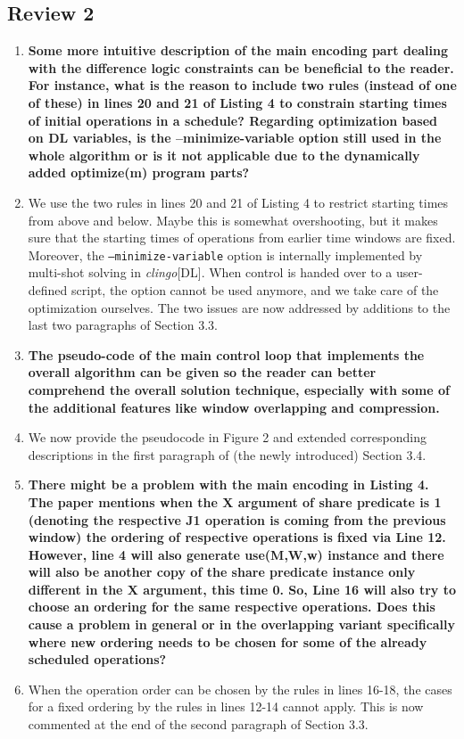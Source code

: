 \documentclass[11pt]{article}
\begin{document}
\subsection*{Review 2}
\begin{enumerate}[wide, labelwidth=!, labelindent=0pt]
\item \textbf{%
	Some more intuitive description of the main encoding part dealing with the difference logic constraints can be beneficial to the reader. For instance, what is the reason to include two rules (instead of one of these) in lines 20 and 21 of Listing 4 to constrain starting times of initial operations in a schedule? Regarding optimization based on DL variables, is the --minimize-variable option still used in the whole algorithm or is it not applicable due to the dynamically added optimize(m) program parts?}
\item[] We use the two rules in lines 20 and 21 of Listing 4 to restrict starting times from
        above and below. Maybe this is somewhat overshooting, but it makes sure that the starting
		times of operations from earlier time windows are fixed.
		Moreover, the \texttt{--minimize-variable} option is internally implemented by multi-shot solving in \textit{clingo}[DL].
		When control is handed over to a user-defined script, the option cannot be used anymore,
		and we take care of the optimization ourselves.
		The two issues are now addressed by additions to the last two paragraphs of Section 3.3.
\item \textbf{%
    The pseudo-code of the main control loop that implements the overall algorithm can be given so the reader can better comprehend the overall solution technique, especially with some of the additional features like window overlapping and compression.}
\item[] We now provide the pseudocode in Figure 2 and extended corresponding descriptions
        in the first paragraph of (the newly introduced) Section 3.4. 
\item \textbf{%
    There might be a problem with the main encoding in Listing 4. The paper mentions when the X argument of share predicate is 1 (denoting the respective J1 operation is coming from the previous window) the ordering of respective operations is fixed via Line 12. However, line 4 will also generate use(M,W,w) instance and there will also be another copy of the share predicate instance only different in the X argument, this time 0. So, Line 16 will also try to choose an ordering for the same respective operations. Does this cause a problem in general or in the overlapping variant specifically where new ordering needs to be chosen for some of the already scheduled operations?}
\item[] When the operation order can be chosen by the rules in lines 16-18, the cases for a fixed
        ordering by the rules in lines 12-14 cannot apply. 
		This is now commented at the end of the second paragraph of Section 3.3.
\end{enumerate}
\end{document}
